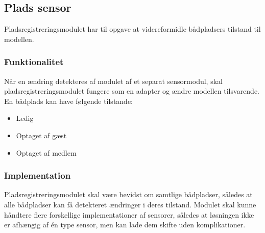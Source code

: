 \subsection{Plads sensor}
\label{sub:plads_registrering}

Pladsregistreringsmodulet har til opgave at videreformidle bådpladsers tilstand til modellen. 

\subsubsection{Funktionalitet}
\label{ssub:plads_registrering_funktionalitet}

Når en ændring detekteres af modulet af et separat sensormodul, skal pladsregistreringsmodulet fungere som en adapter og ændre modellen tilsvarende. En bådplads kan have følgende tilstande:

\begin{itemize}
  \item Ledig
  \item Optaget af gæst
  \item Optaget af medlem
\end{itemize}

\subsubsection{Implementation}
\label{ssub:plads_registrering_implementation}

Pladsregistreringsmodulet skal være bevidst om samtlige bådpladser, således at alle bådpladser kan få detekteret ændringer i deres tilstand. 
Modulet skal kunne håndtere flere forskellige implementationer af sensorer, således at løsningen ikke er afhængig af én type sensor, men kan lade dem skifte uden komplikationer.
